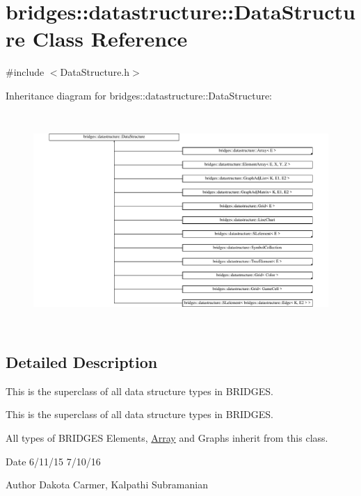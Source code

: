 \hypertarget{classbridges_1_1datastructure_1_1_data_structure}{}\section{bridges\+:\+:datastructure\+:\+:Data\+Structure Class Reference}
\label{classbridges_1_1datastructure_1_1_data_structure}


{\ttfamily \#include $<$Data\+Structure.\+h$>$}

Inheritance diagram for bridges\+:\+:datastructure\+:\+:Data\+Structure\+:\begin{figure}[H]
\begin{center}
\leavevmode
\includegraphics[height=8.216704cm]{classbridges_1_1datastructure_1_1_data_structure}
\end{center}
\end{figure}


\subsection{Detailed Description}
This is the superclass of all data structure types in B\+R\+I\+D\+G\+ES. 

This is the superclass of all data structure types in B\+R\+I\+D\+G\+ES.

All types of B\+R\+I\+D\+G\+ES Elements, \hyperlink{classbridges_1_1datastructure_1_1_array}{Array} and Graphs inherit from this class.

\begin{DoxyDate}{Date}
6/11/15 7/10/16 
\end{DoxyDate}
\begin{DoxyAuthor}{Author}
Dakota Carmer, Kalpathi Subramanian 
\end{DoxyAuthor}
